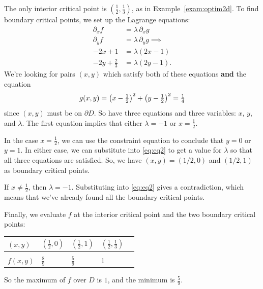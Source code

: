 \documentclass[svgnames]{watsonbook}
\begin{document}
  \begin{solution}
    The only interior critical point is
    $\left(\tfrac{1}{2},\tfrac{1}{3}\right)$, as in
    Example~\ref{exam:optim2d}. To find boundary critical points, we
    set up the Lagrange equations:
    \begin{align} \nonumber
      \partial_x f &= \lambda \, \partial_x g \\ \nonumber
      \partial_y f &= \lambda \, \partial_y g \implies \\ 
      -2x + 1 &= \lambda(2x - 1)  \\ \label{eq:eq2}
      -2y + \tfrac{2}{3} &= \lambda(2y-1). 
    \end{align}
    We're looking for pairs $(x,y)$ which satisfy both of these
    equations \textbf{and} the equation
    \begin{equation} 
          g(x,y) = \left(x-\tfrac{1}{2}\right)^2 +
          \left(y-\tfrac{1}{2}\right)^2 = \tfrac{1}{4} \\ 
    \end{equation}
    since
    $(x,y)$ must be on $\partial D$. So have three equations and three
    variables: $x$, $y$, and $\lambda$. The first equation implies
    that either $\lambda = -1$ or $x = \tfrac{1}{2}$.

    In the case $x = \frac{1}{2}$, we can use the constraint equation
    to conclude that $y = 0$ or $y = 1$. In either case, we can
    substitute into \eqref{eq:eq2} to get a value for $\lambda$ so
    that all three equations are satisfied. So, we have
    $(x,y) = (1/2, 0)$ and $(1/2,1)$ as boundary critical points.

    If $x \neq \tfrac{1}{2}$, then $\lambda = -1$. Substituting into
    \eqref{eq:eq2} gives a contradiction, which means that we've
    already found all the boundary critical points.

    Finally, we evaluate $f$ at the interior critical point and the
    two boundary critical points:
    \begin{center}
      \begin{tabular}{M{1.2cm}|M{1.2cm}M{1.2cm}M{2cm}N}
        $(x,y)$ & $\left(\frac{1}{2}, 0\right)$  & $\left(\frac{1}{2},
                                1\right)$ &
                                            $\left(\frac{1}{2},
                                            \frac{1}{3} \right)$ &
        \\[12pt] \hline  \\[-8pt] 
        $f(x,y)$ & $\frac{8}{9}$ & $\frac{5}{9}$ & 1 &  \\
      \end{tabular}
    \end{center}
    So the maximum of $f$ over $D$ is $1$, and the minimum is
    $\frac{5}{9}$. 
  \end{solution}
\end{document}
